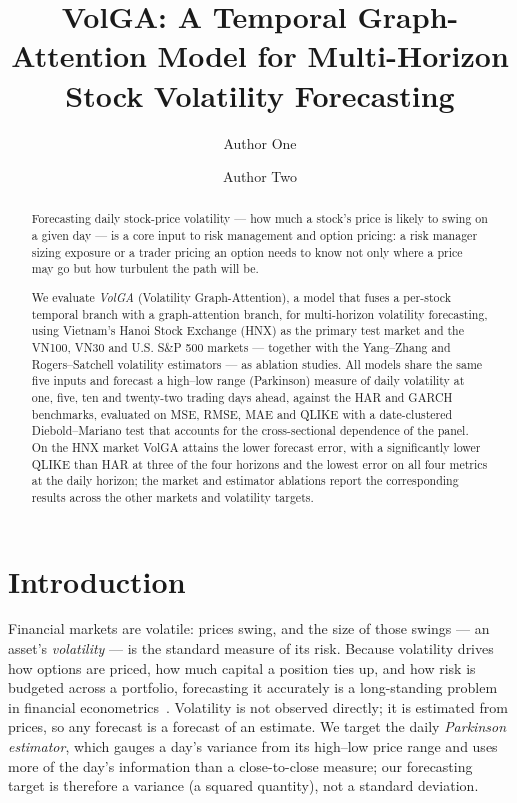 \documentclass[runningheads]{llncs}
\begin{document}
\title{VolGA: A Temporal Graph-Attention Model for Multi-Horizon Stock Volatility Forecasting}

\author{Author One \and Author Two}

\maketitle

\begin{abstract}
Forecasting daily stock-price volatility --- how much a stock's price is likely to swing on a given day --- is a
core input to risk management and option pricing: a risk manager sizing exposure or a trader pricing an option
needs to know not only where a price may go but how turbulent the path will be.

We evaluate \emph{VolGA} (Volatility Graph-Attention), a model that fuses a per-stock temporal branch with a graph-attention branch, for multi-horizon volatility forecasting, using Vietnam's Hanoi Stock
Exchange (HNX) as the primary test market and the VN100, VN30 and U.S. S\&P 500 markets --- together with the
Yang--Zhang and Rogers--Satchell volatility estimators --- as ablation studies. All models share the same five
inputs and forecast a high--low range (Parkinson) measure of daily volatility at one, five, ten and twenty-two
trading days ahead, against the HAR and GARCH benchmarks, evaluated on MSE, RMSE, MAE and QLIKE with a
date-clustered Diebold--Mariano test that accounts for the cross-sectional dependence of the panel. On the HNX
market VolGA attains the lower forecast error, with a significantly lower QLIKE than HAR at three of the
four horizons and the lowest error on all four metrics at the daily horizon; the market and estimator ablations
report the corresponding results across the other markets and volatility targets.
\end{abstract}

\section{Introduction}
Financial markets are volatile: prices swing, and the size of those swings --- an asset's \emph{volatility} ---
is the standard measure of its risk. Because volatility drives how options are priced, how much capital a
position ties up, and how risk is budgeted across a portfolio, forecasting it accurately is a long-standing
problem in financial econometrics~\cite{corsi2009}. Volatility is not observed directly; it is estimated from
prices, so any forecast is a forecast of an estimate. We target the daily \emph{Parkinson estimator}, which
gauges a day's variance from its high--low price range and uses more of the day's information than a
close-to-close measure; our forecasting target is therefore a variance (a squared quantity), not a standard
deviation.
\end{document}
